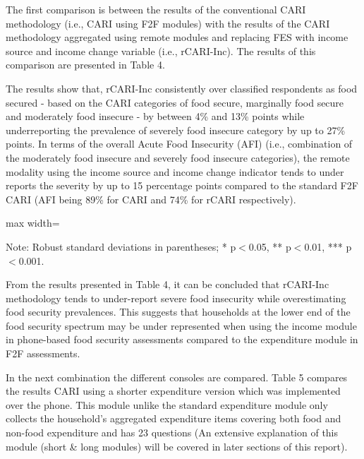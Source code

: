 \documentclass[11pt,harvard]{article}
\begin{document}
	The first comparison is between the results of the conventional CARI methodology (i.e., CARI using F2F modules) with the results of the CARI methodology aggregated using remote modules and replacing FES with income source and income change variable (i.e., rCARI-Inc). The results of this comparison are presented in Table 4.
	
	The results show that, rCARI-Inc consistently over classified  respondents as food secured - based on the CARI categories of food secure, marginally food secure and moderately food insecure - by between 4\% and 13\% points while underreporting the prevalence of severely food insecure category by up to 27\% points. In terms of the overall Acute Food Insecurity (AFI) (i.e., combination of the moderately food insecure and severely food insecure categories), the remote modality using the income source and income change indicator tends to under reports the severity by up to 15 percentage points compared to the standard F2F CARI (AFI being 89\% for CARI and 74\% for rCARI respectively).  
	
	\begin{table}[htbp]
		\centering
		\begin{adjustbox}{max width=\textwidth}%
			\begin{threeparttable}
				\caption{Impact of Survey Modality: Standard CARI-FES vs. Standard rCARI-Inc}
				\scriptsize
				 
				\label{tab:CARI_rCARI_Modality_BF}
				\begin{tablenotes}
					\item Note: Robust standard deviations in parentheses; * p$<$0.05, ** p$<$0.01, *** p$<$0.001. 
				\end{tablenotes}
			\end{threeparttable}
		\end{adjustbox}
	\end{table}
	
	From the results presented in Table 4, it can be concluded that rCARI-Inc methodology tends to under-report severe food insecurity while overestimating food security prevalences. This suggests that households at the lower end of the food security spectrum may be under represented when using the income module in phone-based food security assessments compared to the expenditure module in F2F assessments.
	
	In the next combination the different consoles are compared. Table 5 compares the results CARI using a shorter expenditure version which was implemented over the phone. This module unlike the standard expenditure module only collects the household's aggregated expenditure items covering both food and non-food expenditure and has 23 questions (An extensive explanation of this module (short \& long modules) will be covered in later sections of this report). 
	
\end{document}
